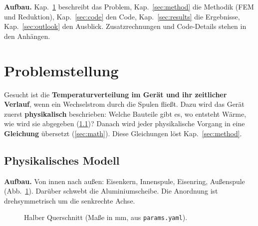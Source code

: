 \documentclass[a4paper, 10pt, conference]{ieeeconf}
\begin{document}
\textbf{Aufbau.} Kap.~\ref{sec:problem} beschreibt das Problem,
Kap.~\ref{sec:method} die Methodik (FEM und Reduktion),
Kap.~\ref{sec:code} den Code, Kap.~\ref{sec:results} die Ergebnisse,
Kap.~\ref{sec:outlook} den Ausblick. Zusatzrechnungen und Code-Details
stehen in den Anhängen.

\section{Problemstellung}
\label{sec:problem}

Gesucht ist die \textbf{Temperaturverteilung im Gerät und ihr zeitlicher
Verlauf}, wenn ein Wechselstrom durch die Spulen fließt. Dazu wird das Gerät
zuerst \textbf{physikalisch} beschrieben: Welche Bauteile gibt es, wo
entsteht Wärme, wie wird sie abgegeben (\ref{sec:phys})? Danach wird jeder
physikalische Vorgang in eine \textbf{Gleichung} übersetzt
(\ref{sec:math}). Diese Gleichungen löst Kap.~\ref{sec:method}.

\subsection{Physikalisches Modell}
\label{sec:phys}

\textbf{Aufbau.} Von innen nach außen: Eisenkern, Innenspule, Eisenring,
Außenspule (Abb.~\ref{fig:geom}). Darüber schwebt die Aluminiumscheibe. Die
Anordnung ist drehsymmetrisch um die senkrechte Achse.

\begin{figure}[t]
\centering
{}
\caption{Halber Querschnitt (Maße in mm, aus \texttt{params.yaml}).}
\label{fig:geom}
\end{figure}
\end{document}
